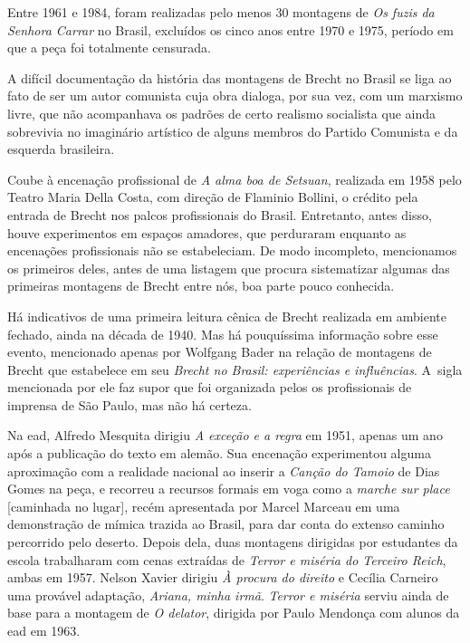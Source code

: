 {Entre 1961 e 1984, foram realizadas pelo menos 30 montagens de {\it Os
fuzis da Senhora Carrar} no Brasil, excluídos os cinco anos entre 1970 e
1975, período em que a peça foi totalmente censurada.

\subject{Brecht dos amadores}

A difícil documentação da história das montagens de Brecht no Brasil se
liga ao fato de ser um autor comunista cuja obra dialoga, por sua vez,
com um marxismo livre, que não acompanhava os padrões de certo realismo
socialista que ainda sobrevivia no imaginário artístico de alguns
membros do Partido Comunista e da esquerda brasileira.

Coube à encenação profissional de {\it A alma boa de Setsuan}, realizada
em 1958 pelo Teatro Maria Della Costa, com direção de Flaminio Bollini,
o crédito pela entrada de Brecht nos palcos profissionais do Brasil.
Entretanto, antes disso, houve experimentos em espaços amadores, que
perduraram enquanto as encenações profissionais não se estabeleciam. De
modo incompleto, mencionamos os primeiros deles, antes de uma listagem
que procura sistematizar algumas das primeiras montagens de Brecht entre
nós, boa parte pouco conhecida.

Há indicativos de uma primeira leitura cênica de Brecht realizada em
ambiente fechado, ainda na década de 1940. Mas há pouquíssima informação
sobre esse evento, mencionado apenas por Wolfgang Bader na relação de
montagens de Brecht que estabelece em seu {\it Brecht no Brasil:
experiências e influências}. A~sigla mencionada por ele faz supor que
foi organizada pelos os profissionais de imprensa de São Paulo, mas não
há certeza.

Na {\sc ead}, Alfredo Mesquita dirigiu {\it A exceção e a regra} em 1951,
apenas um ano após a publicação do texto em alemão. Sua encenação
experimentou alguma aproximação com a realidade nacional ao inserir a
{\it Canção do Tamoio} de Dias Gomes na peça, e recorreu a recursos
formais em voga como a {\it marche sur place} {[}caminhada no lugar{]},
recém apresentada por Marcel Marceau em uma demonstração de mímica
trazida ao Brasil, para dar conta do extenso caminho percorrido pelo
deserto. Depois dela, duas montagens dirigidas por estudantes da escola
trabalharam com cenas extraídas de {\it Terror e miséria do Terceiro
Reich}, ambas em 1957. Nelson Xavier dirigiu {\it À procura do direito}
e Cecília Carneiro uma provável adaptação, {\it Ariana, minha irmã}.
{\it Terror e miséria} serviu ainda de base para a montagem de {\it O
delator}, dirigida por Paulo Mendonça com alunos da {\sc ead} em 1963.

}
